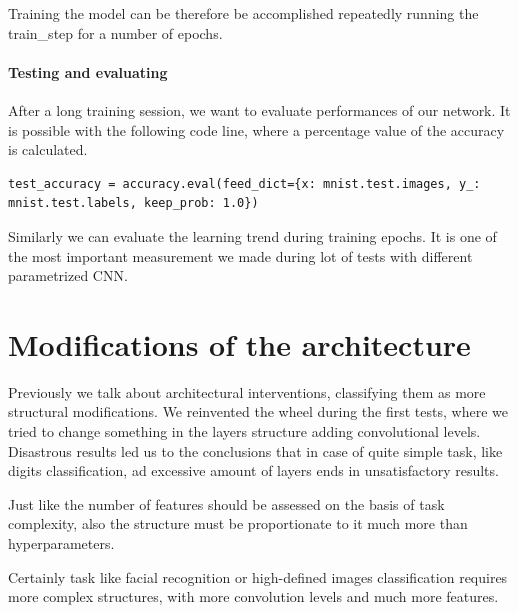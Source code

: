 Training the model can be therefore be accomplished repeatedly running the train\_step for a number of epochs.

\paragraph{Testing and evaluating}

After a long training session, we want to evaluate performances of our network. It is possible with the following code line, where a percentage value of the accuracy is calculated.

\begin{lstlisting}
test_accuracy = accuracy.eval(feed_dict={x: mnist.test.images, y_: mnist.test.labels, keep_prob: 1.0})
\end{lstlisting}

Similarly we can evaluate the learning trend during training epochs. It is one of the most important measurement we made during lot of tests with different parametrized \acs{CNN}.

\section{Modifications of the architecture}

Previously we talk about architectural interventions, classifying them as more structural modifications. We reinvented the wheel during the first tests, where we tried to change something in the layers structure adding convolutional levels. Disastrous results led us to the conclusions that in case of quite simple task, like digits classification, ad excessive amount of layers ends in unsatisfactory results.

Just like the number of features should be assessed on the basis of task complexity, also the structure must be proportionate to it much more than hyperparameters.

Certainly task like facial recognition or high-defined images classification requires more complex structures, with more convolution levels and much more features.
